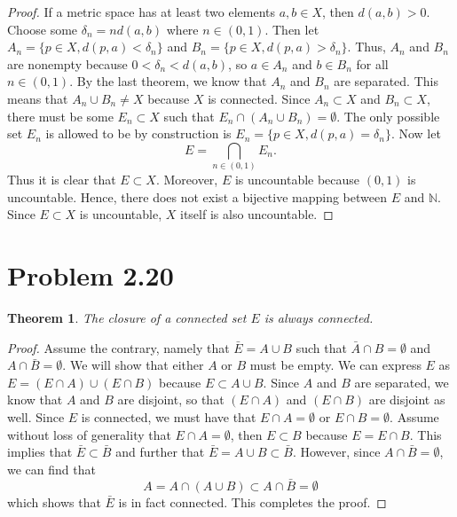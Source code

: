 \documentclass[psamsfonts]{amsart}
\newtheorem{thm}{Theorem}[section]
\theoremstyle{definition}
\theoremstyle{remark}
\numberwithin{equation}{section}
\begin{document}
\begin{proof}
If a metric space has at least two elements $a,b \in X$, then $d(a,b) > 0$. Choose some $\delta_n = n d(a,b)$ where $n \in (0,1)$. Then let $A_n = \{ p \in X, d(p,a) < \delta_n \}$ and $B_n = \{ p \in X, d(p,a) > \delta_n \}$. Thus, $A_n$ and $B_n$ are nonempty because $0 < \delta_n < d(a,b)$, so $a \in A_n$ and $b \in B_n$ for all $n \in (0,1)$. By the last theorem, we know that $A_n$ and $B_n$ are separated. This means that $A_n \cup B_n \neq X$ because $X$ is connected. Since $A_n \subset X$ and $B_n \subset X$, there must be some $E_n \subset X$ such that $E_n \cap ( A_n \cup B_n) = \emptyset$. The only possible set $E_n$ is allowed to be by construction is $E_n = \{ p \in X, d(p,a) = \delta_n \}$. Now let 
\begin{equation}
E = \bigcap_{n \in (0,1)} E_n.
\end{equation}
Thus it is clear that $E \subset X$. Moreover, $E$ is uncountable because $(0,1)$ is uncountable. Hence, there does not exist a bijective mapping between $E$ and $\mathbb{N}$. Since $E \subset X$ is uncountable, $X$ itself is also uncountable.
\end{proof}

\section{Problem 2.20}

\begin{thm}
The closure of a connected set $E$ is always connected.
\end{thm}

\begin{proof}
Assume the contrary, namely that $\bar{E} = A \cup B$ such that $\bar{A} \cap B = \emptyset$ and $A \cap \bar{B} = \emptyset$. We will show that either $A$ or $B$ must be empty. We can express $E$ as $E = (E \cap A) \cup (E \cap B)$ because $E \subset A \cup B$. Since $A$ and $B$ are separated, we know that $A$ and $B$ are disjoint, so that $(E \cap A)$ and $(E \cap B)$ are disjoint as well. Since $E$ is connected, we must have that $E \cap A = \emptyset$ or $E \cap B = \emptyset$. Assume without loss of generality that $E \cap A = \emptyset$, then $E \subset B$ because $E = E \cap B$. This implies that $\bar{E} \subset \bar{B}$ and further that $\bar{E} = A \cup B \subset \bar{B}$. However, since $A \cap \bar{B} = \emptyset$, we can find that
\begin{equation}
A = A \cap (A \cup B) \subset A \cap \bar{B} = \emptyset
\end{equation} 
which shows that $\bar{E}$ is in fact connected. This completes the proof.
\end{proof}
\end{document}
